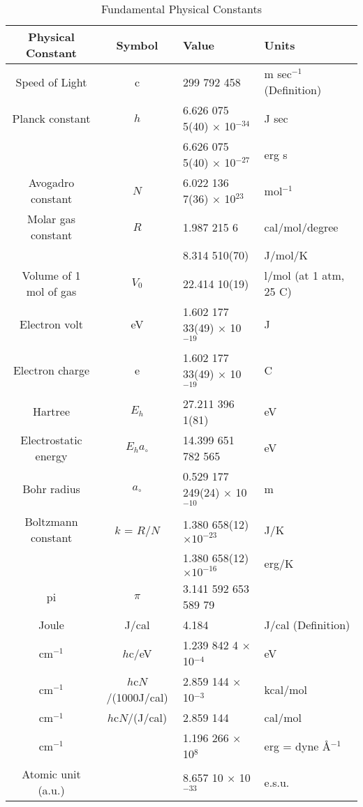 \begin{table}
\caption{\label{codata} Fundamental Physical Constants}
\begin{center}
\begin{tabular}{|ccll|}\hline
Physical Constant & Symbol &Value &Units \\ \hline 
Speed of Light    &     c  &  299 792 458 &m sec$^{-1}$ (Definition)\\
Planck constant   &   $h$  & 6.626 075 5(40)  $\times$ 10$^{-34}$ &J sec \\
&&  6.626 075 5(40) $\times$ 10$^{-27}$ & erg s\\
Avogadro constant & $N$    & 6.022 136 7(36)  $\times$  10$^{23}$&mol$^{-1}$ \\
Molar gas constant & $R$   & 1.987 215 6  & cal/mol/degree\\
            & & 8.314 510(70) & J/mol/K \\
Volume of 1 mol of gas& $V_0$ & 22.414 10(19) & l/mol (at 1 atm, 25 C) \\
Electron volt     & eV     & 1.602 177 33(49) $\times$ 10$^{-19}$&J \\
Electron charge   & e      & 1.602 177 33(49) $\times$ 10$^{-19}$&C \\
Hartree           & $E_h$  & 27.211 396 1(81) & eV \\
Electrostatic energy & $E_ha_{\circ}$ & 14.399 651 782 565 &eV \\
Bohr radius       & $a_{\circ}$ & 0.529 177 249(24) $\times$  10$^{-10}$ & m \\
Boltzmann constant& $k$ = $R/N$ & 1.380 658(12) $\times 10^{-23}$& J/K \\
                  &              & 1.380 658(12) $\times 10^{-16}$& erg/K\\
pi & $\pi$ & 3.141 592 653 589 79 & \\
Joule             & J/cal  & 4.184        & J/cal (Definition)\\
 cm$^{-1}$ &  $h$c/eV   & 1.239 842 4  $\times$  10$^{-4}$ & eV\\
 cm$^{-1}$ & $h$c$N$/(1000J/cal)& 2.859 144  $\times$  10$^{-3}$ & kcal/mol\\
 cm$^{-1}$&$h$c$N$/(J/cal)& 2.859 144 &cal/mol \\
cm$^{-1}$   & & 1.196 266 $\times$  10$^{8}$ & erg = dyne \AA $^{-1}$\\
Atomic unit (a.u.)     &        & 8.657 10 $\times$  10$^{-33}$ &e.s.u. \\

\end{tabular}
\end{center}
\end{table}
